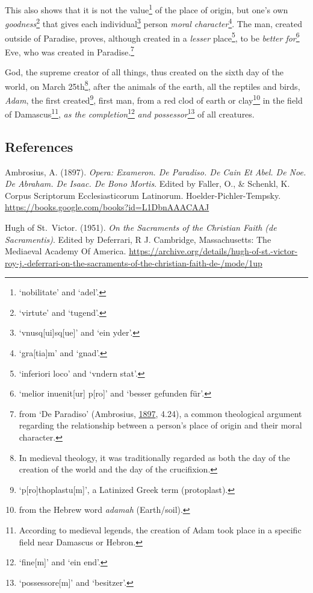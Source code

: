 \documentclass[
]{article}
\begin{document}
This also shows that it is not the value\footnote{`nobilitate' and
  `adel'.} of the place of origin, but one's own
\emph{goodness}\footnote{`virtute' and `tugend'.} that gives each
individual\footnote{`vnusq{[}ui{]}sq{[}ue{]}' and `ein yder'.} person
\emph{moral character}\footnote{`gra{[}tia{]}m' and `gnad'.}. The man,
created outside of Paradise, proves, although created in a \emph{lesser}
place\footnote{`inferiori loco' and `vndern stat'.}, to be \emph{better
for}\footnote{`melior inuenit{[}ur{]} p{[}ro{]}' and `besser gefunden
  für'.} Eve, who was created in Paradise.\footnote{from `De Paradiso'
  (Ambrosius,
  \href{https://books.google.com/books?id=L1DbnAAACAAJ}{1897}, 4.24), a
  common theological argument regarding the relationship between a
  person's place of origin and their moral character.}

God, the supreme creator of all things, thus created on the sixth day of
the world, on March 25th\footnote{In medieval theology, it was
  traditionally regarded as both the day of the creation of the world
  and the day of the crucifixion.}, after the animals of the earth, all
the reptiles and birds, \emph{Adam}, the first created\footnote{`p{[}ro{]}thoplastu{[}m{]}',
  a Latinized Greek term (protoplast).}, first man, from a red clod of
earth or clay\footnote{from the Hebrew word \emph{adamah} (Earth/soil).}
in the field of Damascus\footnote{According to medieval legends, the
  creation of Adam took place in a specific field near Damascus or
  Hebron.}, \emph{as the completion}\footnote{`fine{[}m{]}' and `ein
  end'.} \emph{and possessor}\footnote{`possessore{[}m{]}' and
  `besitzer'.} of all creatures.

\hypertarget{references}{%
\subsection{References}\label{references}}

Ambrosius, A. (1897). \emph{Opera: Exameron. De Paradiso. De Cain Et
Abel. De Noe. De Abraham. De Isaac. De Bono Mortis}. Edited by Faller,
O., \& Schenkl, K. Corpus Scriptorum Ecclesiasticorum Latinorum.
Hoelder-Pichler-Tempsky.
\url{https://books.google.com/books?id=L1DbnAAACAAJ}

Hugh of St.~Victor. (1951). \emph{On the Sacraments of the Christian
Faith (de Sacramentis)}. Edited by Deferrari, R J. Cambridge,
Massachusetts: The Mediaeval Academy Of America.
\url{https://archive.org/details/hugh-of-st.-victor-roy-j.-deferrari-on-the-sacraments-of-the-christian-faith-de-/mode/1up}
\end{document}
